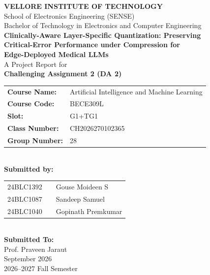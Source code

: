 \documentclass[conference]{IEEEtran}
\begin{document}
\begin{titlepage}
\begin{center}
    {\LARGE \textbf{VELLORE INSTITUTE OF TECHNOLOGY}}\\[0.35cm]
    {\large School of Electronics Engineering (SENSE)}\\[0.2cm]
    {\large Bachelor of Technology in Electronics and Computer Engineering}\\[1.5cm]

    {\Large \textbf{Clinically-Aware Layer-Specific Quantization: Preserving\\
    Critical-Error Performance under Compression for\\
    Edge-Deployed Medical LLMs}}\\[1.5cm]

    {\large A Project Report for}\\[0.25cm]
    {\Large \textbf{Challenging Assignment 2 (DA 2)}}\\[1.2cm]

    \begin{tabular}{ll}
        \textbf{Course Name:}  & Artificial Intelligence and Machine Learning \\
        \textbf{Course Code:}  & BECE309L \\
        \textbf{Slot:}         & G1+TG1 \\
        \textbf{Class Number:} & CH2026270102365 \\
        \textbf{Group Number:} & 28 \\
    \end{tabular}\\[1.5cm]

    \textbf{\large Submitted by:}\\[0.3cm]
    \begin{tabular}{lll}
        24BLC1392 & & Gouse Moideen S \\
        24BLC1087 & & Sandeep Samuel \\
        24BLC1040 & & Gopinath Premkumar \\
    \end{tabular}\\[1.5cm]

    \textbf{\large Submitted To:}\\[0.3cm]
    {\large Prof. Praveen Jaraut}\\[1.5cm]

    {\large September 2026}\\[0.2cm]
    {\large 2026--2027 Fall Semester}
\end{center}
\end{titlepage}
\end{document}
